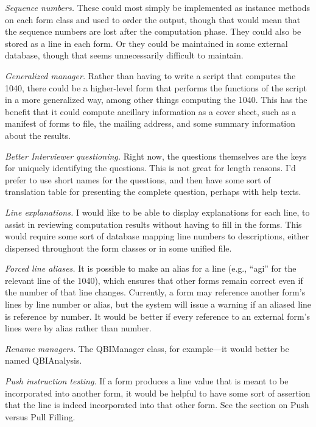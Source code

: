 \emph{Sequence numbers.} These could most simply be implemented as instance
methods on each form class and used to order the output, though that would mean
that the sequence numbers are lost after the computation phase. They could also
be stored as a line in each form. Or they could be maintained in some external
database, though that seems unnecessarily difficult to maintain.

\emph{Generalized manager.} Rather than having to write a script that computes
the 1040, there could be a higher-level form that performs the functions of the
script in a more generalized way, among other things computing the 1040. This
has the benefit that it could compute ancillary information as a cover sheet,
such as a manifest of forms to file, the mailing address, and some summary
information about the results.

\emph{Better Interviewer questioning.} Right now, the questions themselves are
the keys for uniquely identifying the questions. This is not great for length
reasons. I'd prefer to use short names for the questions, and then have some
sort of translation table for presenting the complete question, perhaps with
help texts.

\emph{Line explanations.} I would like to be able to display explanations for
each line, to assist in reviewing computation results without having to fill in
the forms. This would require some sort of database mapping line numbers to
descriptions, either dispersed throughout the form classes or in some unified
file.

\emph{Forced line aliases.} It is possible to make an alias for a line (e.g.,
``agi'' for the relevant line of the 1040), which ensures that other forms
remain correct even if the number of that line changes. Currently, a form may
reference another form's lines by line number or alias, but the system will
issue a warning if an aliased line is reference by number. It would be better if
every reference to an external form's lines were by alias rather than number.

\emph{Rename managers.} The QBIManager class, for example---it would better be
named QBIAnalysis.

\emph{Push instruction testing.} If a form produces a line value that is meant
to be incorporated into another form, it would be helpful to have some sort of
assertion that the line is indeed incorporated into that other form. See the
section on Push versus Pull Filling.

